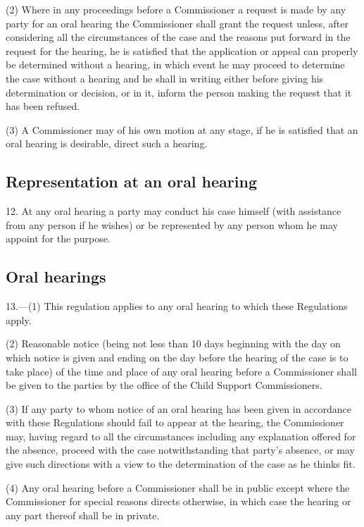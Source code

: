 \documentclass[12pt,a4paper]{article}
\begin{document}
(2) Where in any proceedings before a Commissioner a request is made by any party for an oral hearing the Commissioner shall grant the request unless, after considering all the circumstances of the case and the reasons put forward in the request for the hearing, he is satisfied that the application or appeal can properly be determined without a hearing, in which event he may proceed to determine the case without a hearing and he shall in writing either before giving his determination or decision, or in it, inform the person making the request that it has been refused.

(3) A Commissioner may of his own motion at any stage, if he is satisfied that an oral hearing is desirable, direct such a hearing.

\subsection[12. Representation at an oral hearing]{Representation at an oral hearing}

12.  At any oral hearing a party may conduct his case himself (with assistance from any person if he wishes) or be represented by any person whom he may appoint for the purpose.

\subsection[13. Oral hearings]{Oral hearings}

13.—(1) This regulation applies to any oral hearing to which these Regulations apply.

(2) Reasonable notice (being not less than 10 days beginning with the day on which notice is given and ending on the day before the hearing of the case is to take place) of the time and place of any oral hearing before a Commissioner shall be given to the parties by the office of the Child Support Commissioners.

(3) If any party to whom notice of an oral hearing has been given in accordance with these Regulations should fail to appear at the hearing, the Commissioner may, having regard to all the circumstances including any explanation offered for the absence, proceed with the case notwithstanding that party’s absence, or may give such directions with a view to the determination of the case as he thinks fit.

(4) Any oral hearing before a Commissioner shall be in public except where the Commissioner for special reasons directs otherwise, in which case the hearing or any part thereof shall be in private.
\end{document}
